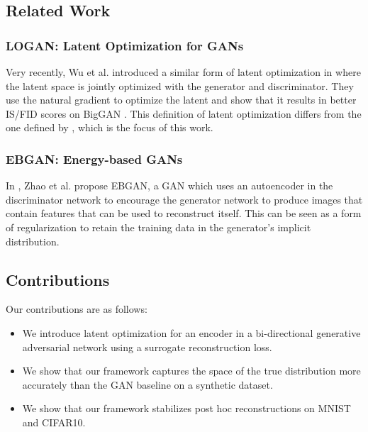 \documentclass[10pt,twocolumn,letterpaper]{article}
\begin{document}
\subsection{Related Work}

\subsubsection{LOGAN: Latent Optimization for GANs}

Very recently, Wu et al. introduced a similar form of latent optimization in \cite{wu2019logan} where the latent space is jointly optimized with the generator and discriminator. They use the natural gradient \cite{amari1998natural} to optimize the latent and show that it results in better IS/FID scores on BigGAN \cite{brock2018large}. This definition of latent optimization differs from the one defined by \cite{bojanowski2017optimizing}, which is the focus of this work.

\subsubsection{EBGAN: Energy-based GANs}

In \cite{zhao2016energy}, Zhao et al. propose EBGAN, a GAN which uses an autoencoder in the discriminator network to encourage the generator network to produce images that contain features that can be used to reconstruct itself. This can be seen as a form of regularization to retain the training data in the generator's implicit distribution.

\subsection{Contributions}

Our contributions are as follows:
\begin{itemize}
    \item We introduce latent optimization for an encoder in a bi-directional generative adversarial network using a surrogate reconstruction loss.
    \item We show that our framework captures the space of the true distribution more accurately than the GAN \cite{goodfellow2014generative} baseline on a synthetic dataset.
    \item We show that our framework stabilizes post hoc \cite{dumoulin2016adversarially} reconstructions on MNIST and CIFAR10.
\end{itemize}
\end{document}
